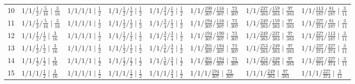 {\begin{tabular}{rlllllll}
10 & $1/1/\tfrac{1}{2}/\tfrac{5}{16} \mid \tfrac{3}{16}$ & $1/1/1/1 \mid \tfrac{1}{2}$ & $1/1/\tfrac{1}{2}/\tfrac{1}{2} \mid \tfrac{1}{2}$ & $1/1/\tfrac{3}{4}/\tfrac{1}{2} \mid \tfrac{1}{2}$ & $1/1/\tfrac{190}{307}/\tfrac{116}{307} \mid \tfrac{73}{307}$ & $1/1/\tfrac{237}{383}/\tfrac{159}{383} \mid \tfrac{97}{383}$ & $1/1/\tfrac{113}{187}/\tfrac{81}{187} \mid \tfrac{3}{11}$\\
11 & $1/1/\tfrac{1}{2}/\tfrac{5}{16} \mid \tfrac{3}{16}$ & $1/1/1/1 \mid \tfrac{1}{2}$ & $1/1/\tfrac{1}{2}/\tfrac{1}{2} \mid \tfrac{1}{2}$ & $1/1/\tfrac{3}{4}/\tfrac{1}{2} \mid \tfrac{1}{2}$ & $1/1/\tfrac{194}{307}/\tfrac{116}{307} \mid \tfrac{73}{307}$ & $1/1/\tfrac{249}{383}/\tfrac{159}{383} \mid \tfrac{97}{383}$ & $1/1/\tfrac{227}{374}/\tfrac{81}{187} \mid \tfrac{3}{11}$\\
12 & $1/1/\tfrac{1}{2}/\tfrac{1}{2} \mid \tfrac{3}{16}$ & $1/1/1/1 \mid \tfrac{1}{2}$ & $1/1/\tfrac{1}{2}/\tfrac{1}{2} \mid \tfrac{1}{2}$ & $1/1/\tfrac{3}{4}/\tfrac{3}{4} \mid \tfrac{1}{2}$ & $1/1/\tfrac{194}{307}/\tfrac{190}{307} \mid \tfrac{73}{307}$ & $1/1/\tfrac{249}{383}/\tfrac{237}{383} \mid \tfrac{97}{383}$ & $1/1/\tfrac{227}{374}/\tfrac{113}{187} \mid \tfrac{3}{11}$\\
13 & $1/1/\tfrac{1}{2}/\tfrac{1}{2} \mid \tfrac{3}{16}$ & $1/1/1/1 \mid \tfrac{1}{2}$ & $1/1/\tfrac{1}{2}/\tfrac{1}{2} \mid \tfrac{1}{2}$ & $1/1/\tfrac{5}{6}/\tfrac{3}{4} \mid \tfrac{1}{2}$ & $1/1/\tfrac{201}{307}/\tfrac{194}{307} \mid \tfrac{73}{307}$ & $1/1/\tfrac{253}{383}/\tfrac{249}{383} \mid \tfrac{97}{383}$ & $1/1/\tfrac{237}{374}/\tfrac{227}{374} \mid \tfrac{3}{11}$\\
14 & $1/1/\tfrac{1}{2}/\tfrac{1}{2} \mid \tfrac{3}{16}$ & $1/1/1/1 \mid \tfrac{1}{2}$ & $1/1/\tfrac{1}{2}/\tfrac{1}{2} \mid \tfrac{1}{2}$ & $1/1/\tfrac{5}{6}/\tfrac{3}{4} \mid \tfrac{1}{2}$ & $1/1/\tfrac{201}{307}/\tfrac{194}{307} \mid \tfrac{73}{307}$ & $1/1/\tfrac{253}{383}/\tfrac{249}{383} \mid \tfrac{97}{383}$ & $1/1/\tfrac{237}{374}/\tfrac{227}{374} \mid \tfrac{3}{11}$\\
15 & $1/1/1/\tfrac{1}{2} \mid \tfrac{3}{16}$ & $1/1/1/1 \mid \tfrac{1}{2}$ & $1/1/1/\tfrac{1}{2} \mid \tfrac{1}{2}$ & $1/1/1/\tfrac{3}{4} \mid \tfrac{1}{2}$ & $1/1/1/\tfrac{194}{307} \mid \tfrac{73}{307}$ & $1/1/1/\tfrac{249}{383} \mid \tfrac{97}{383}$ & $1/1/1/\tfrac{227}{374} \mid \tfrac{3}{11}$\\
\bottomrule
\end{tabular}}
